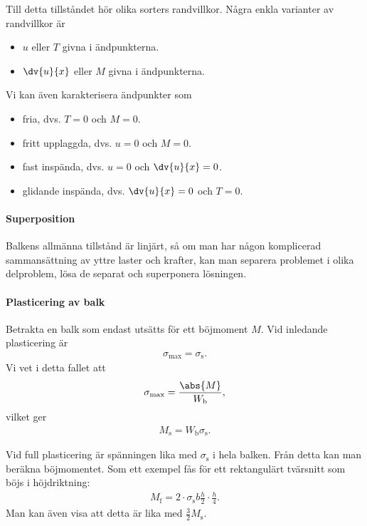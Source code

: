 Till detta tillståndet hör olika sorters randvillkor. Några enkla varianter av randvillkor är
\begin{itemize}
	\item $u$ eller $T$ givna i ändpunkterna.
	\item $\dv{u}{x}$ eller $M$ givna i ändpunkterna.
\end{itemize}
Vi kan även karakterisera ändpunkter som
\begin{itemize}
	\item fria, dvs. $T = 0$ och $M = 0$.
	\item fritt upplaggda, dvs. $u = 0$ och $M = 0$.
	\item fast inspända, dvs. $u = 0$ och $\dv{u}{x} = 0$.
	\item glidande inspända, dvs. $\dv{u}{x} = 0$ och $T = 0$.
\end{itemize}

\paragraph{Superposition}
Balkens allmänna tillstånd är linjärt, så om man har någon komplicerad sammansättning av yttre laster och krafter, kan man separera problemet i olika delproblem, lösa de separat och superponera lösningen.

\paragraph{Plasticering av balk}
Betrakta en balk som endast utsätts för ett böjmoment $M$. Vid inledande plasticering är
\begin{align*}
	\sigma_{\text{max}} = \sigma_{\text{s}}.
\end{align*}
Vi vet i detta fallet att
\begin{align*}
	\sigma_{\text{max}} = \frac{\abs{M}}{W_{\text{b}}},
\end{align*}
vilket ger
\begin{align*}
	M_{\text{s}} = W_{\text{b}}\sigma_{\text{s}}.
\end{align*}

Vid full plasticering är spänningen lika med $\sigma_{\text{s}}$ i hela balken. Från detta kan man beräkna böjmomentet. Som ett exempel fås för ett rektangulärt tvärsnitt som böjs i höjdriktning:
\begin{align*}
	M_{\text{f}} = 2\cdot\sigma_{\text{s}}b\frac{h}{2}\cdot\frac{h}{4}.
\end{align*}
Man kan även visa att detta är lika med $\frac{3}{2}M_{\text{s}}$.

